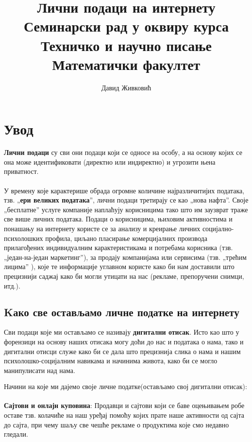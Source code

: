 \documentclass[a4paper]{article}
\title{Лични подаци на интернету\\ \small Семинарски рад у оквиру курса\\Техничко и научно писање\\ Математички факултет}
\author{Давид Живковић}
\begin{document}
\maketitle
\date

\tableofcontents

\newpage

\section{Увод}
\label{sec:увод}
\textbf{Лични подаци} су сви они подаци који се односе на особу, а на основу којих се она може идентификовати (директно или индиректно) и угрозити њена приватност.
\paragraph{}
У времену које карактерише обрада огромне количине најразличитијих података, тзв. „\textbf{ери великих података}”, лични подаци третирају се као „нова нафта”. Своје „бесплатне” услуге компаније наплаћују корисницима тако што им заузврат траже све више личних података. Подаци о корисницима\sloppy, њиховим активностима и понашању на интернету користе се за анализу и креирање личних социјално-психолошких профила, циљано пласирање комерцијалних производа прилагођених индивидуалним карактеристикама и потребама корисника (тзв. „један-на-један маркетинг”), за продају компанијама или сервисима (тзв. „трећим лицима” \cite{third party}), које те информације углавном користе како би нам доставили што прецизнији саджај како би могли утицати на нас (рекламе, препоручени снимци, итд.).

\subsection{Kако све остављамо личне податке на интернету}

Сви подаци које ми остављамо се називају \textbf{дигитални отисак}\cite{3rd party}. Исто као што у форензици на основу наших отисака могу доћи до нас и података о нама, тако и дигитални отисци служе како би се дала што прецизнија слика о нама и нашим психолошко-социјалним навикама и начинима живота, како би се могло манипулисати над нама.

Начини на које ми дајемо своје личне податке(остављамо свој дигитални отисак):
\paragraph{}
\textbf{Сајтови и онлајн куповина}:
Продавци и сајтови који се баве оцењивањем робе оставе тзв. колачиће на наш уређај помоћу којих прате наше активности од сајта до сајта, при чему шаљу све чешће рекламе о продуктима које смо недавно гледали.
\end{document}
